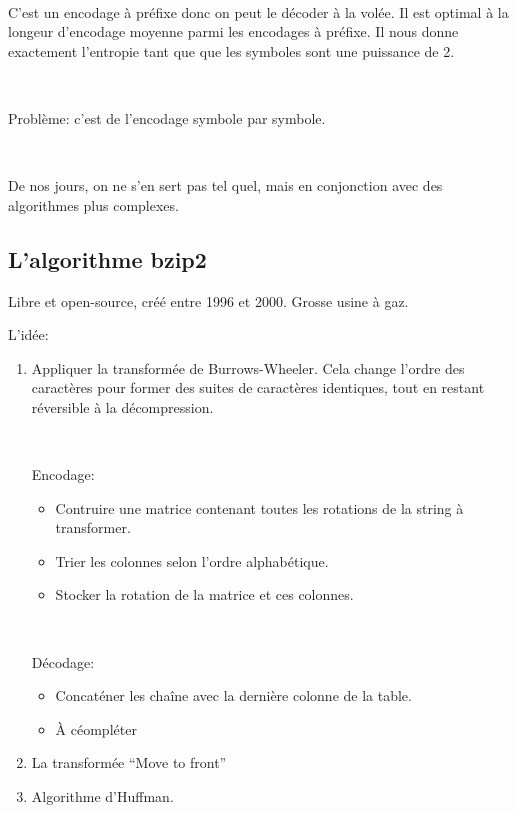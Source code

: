 \documentclass[a4paper,11pt]{article}
\begin{document}
\

C'est un encodage à préfixe donc on peut le décoder à la volée. Il est optimal à
la longeur d'encodage moyenne parmi les encodages à préfixe. Il nous donne
exactement l'entropie tant que que les symboles sont une puissance de 2.

\

Problème: c'est de l'encodage symbole par symbole.

\

De nos jours, on ne s'en sert pas tel quel, mais en conjonction avec des
algorithmes plus complexes.

\subsection{L'algorithme bzip2}

Libre et open-source, créé entre 1996 et 2000. Grosse usine à gaz.

L'idée:

\begin{enumerate}
\item Appliquer la transformée de Burrows-Wheeler. Cela change l'ordre des
  caractères pour former des suites de caractères identiques, tout en restant
  réversible à la décompression.

  \

  Encodage:
  \begin{itemize}
  \item Contruire une matrice contenant toutes les rotations de la string à
    transformer.
  \item Trier les colonnes selon l'ordre alphabétique.
  \item Stocker la rotation de la matrice et ces colonnes.
  \end{itemize}

  \

  Décodage:

  \begin{itemize}
  \item Concaténer les chaîne avec la dernière colonne de la table.
  \item À céompléter
  \end{itemize}

\item La transformée ``Move to front''

\item Algorithme d'Huffman.

\end{enumerate}
\end{document}
